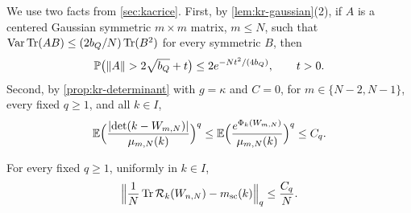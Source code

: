 We use two facts from \cref{sec:kacrice}. First, by \cref{lem:kr-gaussian}(2), if $A$ is a centered Gaussian symmetric $m\times m$ matrix, $m\le N$, such that $\operatorname{Var}\operatorname{Tr}(AB)\le(2b_Q/N)\operatorname{Tr}(B^2)$ for every symmetric $B$, then
\begin{equation}\label{eq:mp-edge}
\mathbb P\bigl(\left\lVert A\right\rVert>2\sqrt{b_Q}+t\bigr)\le2e^{-Nt^2/(4b_Q)},\qquad t>0.
\end{equation}
Second, by \cref{prop:kr-determinant} with $g=\kappa$ and $C=0$, for $m\in\{N-2,N-1\}$, every fixed $q\ge1$, and all $k\in I$,
\begin{equation}\label{eq:mp-det-moments}
\mathbb E\Bigl(\frac{\left|\det(k-W_{m,N})\right|}{\mu_{m,N}(k)}\Bigr)^q\le\mathbb E\Bigl(\frac{e^{\Phi_k(W_{m,N})}}{\mu_{m,N}(k)}\Bigr)^q\le C_q.
\end{equation}

\begin{lemma}\label{lem:mp-trace}
For every fixed $q\ge1$, uniformly in $k\in I$,
\begin{equation}\label{eq:mp-trace}
\Bigl\|\frac1N\operatorname{Tr}\mathcal R_k(W_{n,N})-m_{\rm sc}(k)\Bigr\|_q\le\frac{C_q}N.
\end{equation}
\end{lemma}

